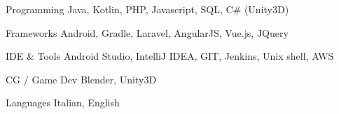 


\begin{cvskills}


\cvskill
{Programming} %
{Java, Kotlin, PHP, Javascript, SQL, C\# (Unity3D)} %


\cvskill
{Frameworks} %
{Android, Gradle, Laravel, AngularJS, Vue.js, JQuery} %


\cvskill
{IDE \& Tools} %
{Android Studio, IntelliJ IDEA, GIT, Jenkins, Unix shell, AWS} %


\cvskill
{CG / Game Dev} %
{Blender, Unity3D} %


\cvskill
{Languages} %
{Italian, English} %


\end{cvskills}